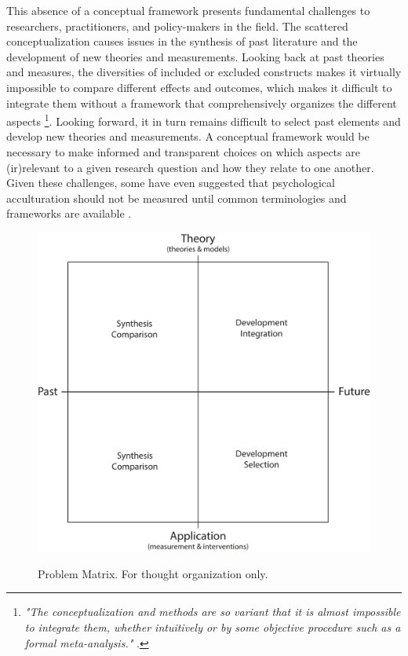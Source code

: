 \documentclass[nobib]{tufte-handout}
\begin{document}
This absence of a conceptual framework presents fundamental challenges to researchers, practitioners, and policy-makers in the field. The scattered conceptualization causes issues in the synthesis of past literature and the development of new theories and measurements.
Looking back at past theories and measures, the diversities of included or excluded constructs makes it virtually impossible to compare different effects and outcomes, which makes it difficult to integrate them without a framework that comprehensively organizes the different aspects \citep{Taft1981}\footnote{\textit{"The conceptualization and methods are so variant that it is almost impossible to integrate them, whether intuitively or by some objective procedure such as a formal meta-analysis."} \citep[p. 343]{Taft1981}.}.
Looking forward, it in turn remains difficult to select past elements and develop new theories and measurements. A conceptual framework would be necessary to make informed and transparent choices on which aspects are (ir)relevant to a given research question and how they relate to one another.
Given these challenges, some have even suggested that psychological acculturation should not be measured until common terminologies and frameworks are available \citep{Escobar2000}.

\begin{figure}[hbt!]
\centering
\caption{Problem Matrix. For thought organization only.}
\includegraphics[width=\textwidth]{Figures/ProblemMatrix.pdf}
\label{fig:ProblemMatrix}
\end{figure}
\end{document}
